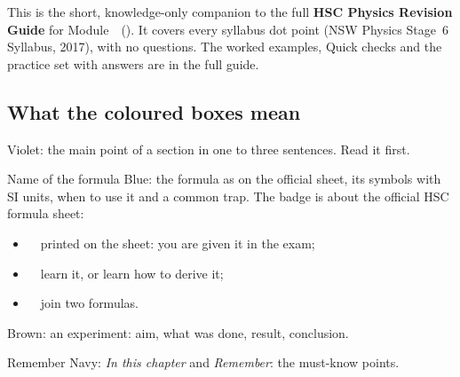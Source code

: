 \documentclass[11pt,a4paper,oneside,openany]{book}
\begin{document}
\makecover


This is the short, knowledge-only companion to the full \textbf{HSC Physics Revision Guide}
for Module~\modulenumber\ (\moduletitle). It covers every syllabus dot point (NSW Physics
Stage~6 Syllabus, 2017), with no questions. The worked examples, Quick checks and the
practice set with answers are in the full guide.

\subsection*{What the coloured boxes mean}

\begin{sidebyside}[0.5]
  \begin{bigidea}[before skip=0pt, after skip=0pt, equal height group=esslegA, fontupper=\normalsize]
    Violet: the main point of a section in one to three sentences. Read it first.
  \end{bigidea}
\nextside
  \begin{keywords}[before skip=0pt, after skip=0pt, equal height group=esslegA]
  \end{keywords}
\end{sidebyside}

\begin{formulacard}[unbreakable, before skip=6pt, after skip=6pt]{Name of the formula}
  Blue: the formula as on the official sheet, its symbols with SI units, when to use it
  and a common trap. The badge is about the official HSC formula sheet:
  \begin{itemize}[itemsep=0pt, topsep=1pt]
    \item \hscbadgeonsheet\ \ printed on the sheet: you are given it in the exam;
    \item \hscbadgenotonsheet\ \ learn it, or learn how to derive it;
    \item {}\ \ join two formulas.
  \end{itemize}
\end{formulacard}

\begin{sidebyside}[0.5]
  \begin{experiment}[unbreakable, before skip=0pt, after skip=0pt, equal height group=esslegB]{}
    Brown: an experiment: aim, what was done, result, conclusion.
  \end{experiment}
\nextside
  \begin{summarybox}[unbreakable, before skip=0pt, after skip=0pt, equal height group=esslegB]{Remember}
    Navy: \emph{In this chapter} and \emph{Remember}: the must-know points.
  \end{summarybox}
\end{sidebyside}
\end{document}
